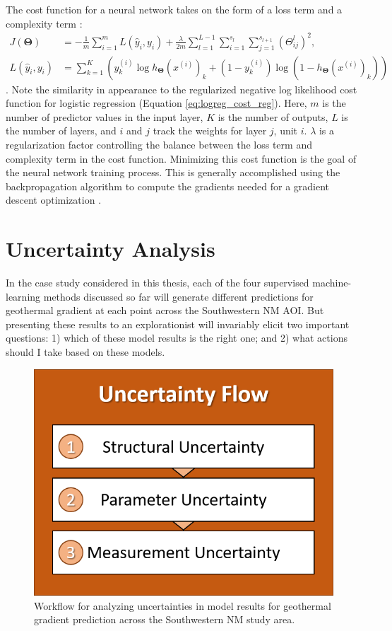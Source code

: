 The cost function for a neural network takes on the form of a loss term and a complexity term \citep{ng_neural_2011}:
\begin{equation}
\label{eq:nn_cost_function}
    \begin{aligned}
        J(\boldsymbol\Theta) &= 
        -\frac{1}{m}\sum_{i=1}^{m}
        L(\hat{y}_i, y_i) + \frac{\lambda}{2m}
        \sum_{l=1}^{L-1}
        \sum_{i=1}^{s_l}
        \sum_{j=1}^{s_{l+1}}\left(\Theta_{ij}^{l}\right)^2, \\
        L(\hat{y}_i, y_i)&=
        \sum_{k=1}^{K}\left(
        y_k^{(i)}\log{h_{\boldsymbol\Theta}\left(x^{(i)}\right)_k}+
        \left(1-y_k^{(i)}\right)\log\left(1-h_{\boldsymbol\Theta}\left(x^{(i)}\right)_k\right)\right)
    \end{aligned}
\end{equation}.
Note the similarity in appearance to the regularized negative log likelihood cost function for logistic regression (Equation \ref{eq:logreg_cost_reg}). Here, $m$ is the number of predictor values in the input layer, $K$ is the number of outputs, $L$ is the number of layers, and $i$ and $j$ track the weights for layer $j$, unit $i$. $\lambda$ is a regularization factor controlling the balance between the loss term and complexity term in the cost function. Minimizing this cost function is the goal of the neural network training process. This is generally accomplished using the backpropagation algorithm to compute the gradients needed for a gradient descent optimization \citep[p.\ 396]{hastie_elements_2009}.

\section{Uncertainty Analysis}\label{ch3:uncertainty_analysis}

In the case study considered in this thesis, each of the four supervised machine-learning methods discussed so far will generate different predictions for geothermal gradient at each point across the Southwestern NM AOI. But presenting these results to an explorationist will invariably elicit two important questions: 1) which of these model results is the right one; and 2) what actions should I take based on these models.

\begin{figure}[!htp]
\centering
\includegraphics[width=.35\linewidth]{templates/images/Flow-Uncertainty.png}
\singlespacing
\caption[Uncertainty analysis workflow]{Workflow for analyzing uncertainties in model results for geothermal gradient prediction across the Southwestern NM study area.}
\label{fig:uncertainty_flow}
\end{figure}

